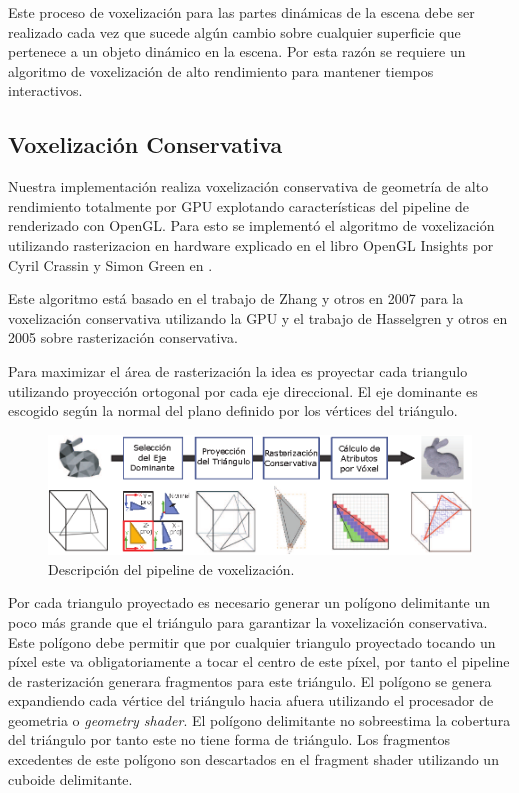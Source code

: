 Este proceso de voxelización para las partes dinámicas de la escena debe ser realizado cada vez que sucede algún cambio sobre cualquier superficie que pertenece a un objeto dinámico en la escena. Por esta razón se requiere un algoritmo de voxelización de alto rendimiento para mantener tiempos interactivos.

\subsection{Voxelización Conservativa} %
\label{sub:voxelizacion_conservativa}
Nuestra implementación realiza voxelización conservativa de geometría de alto rendimiento totalmente por \ac{GPU} explotando características del pipeline de renderizado con OpenGL. Para esto se implementó el algoritmo de voxelización utilizando rasterizacion en hardware explicado en el libro OpenGL Insights por Cyril Crassin y Simon Green en  \cite{CozziRiccio12}. 

Este algoritmo está basado en el trabajo de Zhang y otros en 2007 \cite{zhang2007conservative} para la voxelización conservativa utilizando la \ac{GPU} y el trabajo de Hasselgren y otros en 2005 \cite{hasselgren2005conservative} sobre rasterización conservativa.

Para maximizar el área de rasterización la idea es proyectar cada triangulo utilizando proyección ortogonal por cada eje direccional. El eje dominante es escogido según la normal del plano definido por los vértices del triángulo.

\begin{figure}[H]
	\centering
	\captionsetup{justification=centering}
	\includegraphics[width=\linewidth]{media/voxelization_pipeline.eps}
	\caption{Descripción del pipeline de voxelización.}
\end{figure}
 
Por cada triangulo proyectado es necesario generar un polígono delimitante un poco más grande que el triángulo para garantizar la voxelización conservativa. Este polígono debe permitir que por cualquier triangulo proyectado tocando un píxel este va obligatoriamente a tocar el centro de este píxel, por tanto el pipeline de rasterización generara fragmentos para este triángulo. El polígono se genera expandiendo cada vértice del triángulo hacia afuera utilizando el procesador de geometria o \emph{geometry shader}. El polígono delimitante no sobreestima la cobertura del triángulo por tanto este no tiene forma de triángulo. Los fragmentos excedentes de este polígono son descartados en el fragment shader utilizando un cuboide delimitante.

